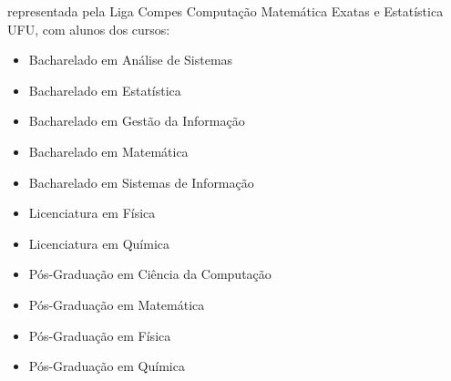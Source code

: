 \begin{article}
\begin{description}[noitemsep]
		\item[UFU] representada pela Liga Compes Computação Matemática Exatas e Estatística UFU, com alunos dos cursos:
		\begin{itemize}[noitemsep]
			\item Bacharelado em Análise de Sistemas
			\item Bacharelado em Estatística
			\item Bacharelado em Gestão da Informação
			\item Bacharelado em Matemática
			\item Bacharelado em Sistemas de Informação
			\item Licenciatura em Física
			\item Licenciatura em Química
			\item Pós-Graduação em Ciência da Computação
			\item Pós-Graduação em Matemática
			\item Pós-Graduação em Física
			\item Pós-Graduação em Química
		\end{itemize}
	\end{description}
\end{article}
